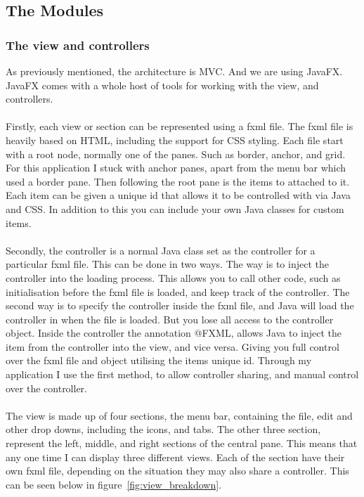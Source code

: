 \subsection{The Modules}
\label{subsec:the_modules}

\subsubsection{The view and controllers}
\label{subsubsec:imp_veiw}

As previously mentioned, the architecture is MVC. And we are using JavaFX. JavaFX comes with a whole host of tools for working with the view, and controllers. 
\\\\
Firstly, each view or section can be represented using a fxml file. The fxml file is heavily based on HTML, including the support for CSS styling. Each file start with a root node, normally one of the panes. Such as border, anchor, and grid. For this application I stuck with anchor panes, apart from the menu bar which used a border pane. Then following the root pane is the items to attached to it. Each item can be given a unique id that allows it to be controlled with via Java and CSS. In addition to this you can include your own Java classes for custom items.
\\\\
Secondly, the controller is a normal Java class set as the controller for a particular fxml file. This can be done in two ways. The way is to inject the controller into the loading process. This allows you to call other code, such as initialisation before the fxml file is loaded, and keep track of the controller. The second way is to specify the controller inside the fxml file, and Java will load the controller in when the file is loaded. But you lose all access to the controller object. Inside the controller the annotation @FXML, allows Java to inject the item from the controller into the view, and vice versa. Giving you full control over the fxml file and object utilising the items unique id. Through my application I use the first method, to allow controller sharing, and manual control over the controller. 
\\\\
The view is made up of four sections, the menu bar, containing the file, edit and other drop downs, including the icons, and tabs. The other three section, represent the left, middle, and right sections of the central pane. This means that any one time I can display three different views. Each of the section have their own fxml file, depending on the situation they may also share a controller. This can be seen below in figure~\ref{fig:view_breakdown}.

